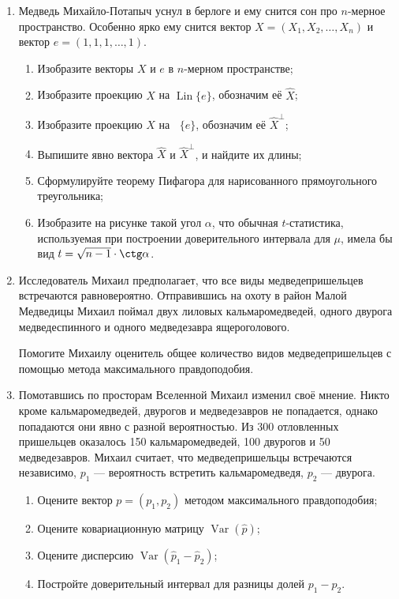 \documentclass[11pt]{article} %
\DeclareMathOperator{\Var}{Var}
\DeclareMathOperator{\Lin}{\mathrm{Lin}}
\DeclareMathOperator{\Linp}{\Lin^{\perp}}
\begin{document}
\begin{enumerate}
  \item Медведь Михайло-Потапыч уснул в берлоге и ему снится сон про $n$-мерное пространство.
    Особенно ярко ему снится вектор $X=(X_1, X_2, \ldots, X_n)$ и вектор $e=(1, 1, 1, \ldots, 1)$.
    \begin{enumerate}
      \item Изобразите векторы $X$ и $e$ в $n$-мерном пространстве;
      \item Изобразите проекцию $X$ на $\Lin \{e\}$, обозначим её $\hat X$;
      \item Изобразите проекцию $X$ на $\Linp \{e\}$, обозначим её $\hat X^{\perp}$;
      \item Выпишите явно вектора $\hat X$ и $\hat X^{\perp}$, и найдите их длины;
      \item Сформулируйте теорему Пифагора для нарисованного прямоугольного треугольника;
      \item Изобразите на рисунке такой угол $\alpha$, что обычная $t$-статистика, используемая при построении доверительного интервала для $\mu$, имела бы вид $t = \sqrt{n-1} \cdot \ctg \alpha$.
    \end{enumerate}

  \item Исследователь Михаил предполагает, что все виды медведепришельцев встречаются равновероятно. 
    Отправившись на охоту в район Малой Медведицы Михаил поймал двух лиловых кальмаромедведей, 
    одного двурога медведеспинного и одного медведезавра ящероголового. 
    
      Помогите Михаилу оценитель общее количество видов медведепришельцев с помощью метода максимального правдоподобия.


    \item Помотавшись по просторам Вселенной Михаил изменил своё мнение. 
      Никто кроме кальмаромедведей, двурогов и медведезавров не попадается, однако попадаются они явно с разной вероятностью. 
      Из 300 отловленных пришельцев оказалось 150 кальмаромедведей, 100 двурогов и 50 медведезавров. 
      Михаил считает, что медведепришельцы встречаются независимо, $p_1$ — вероятность встретить кальмаромедведя, $p_2$ — двурога.

      \begin{enumerate}
	\item Оцените вектор $p = (p_1, p_2)$ методом максимального правдоподобия;
	\item Оцените ковариационную матрицу $\Var(\hat p)$;
	\item Оцените дисперсию $\Var(\hat p_1 - \hat p_2)$;
	\item Постройте доверительный интервал для разницы долей $p_1 - p_2$.
      \end{enumerate}


\end{enumerate}
\end{document}
